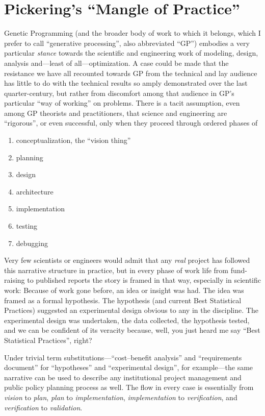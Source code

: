 \section{Pickering's ``Mangle of Practice''}\hypertarget{pickerings-mangle-of-practice}{}\label{pickerings-mangle-of-practice}

Genetic Programming (and the broader body of work to which it belongs, which I prefer to call ``generative processing'', also abbreviated ``GP'') embodies a very particular \emph{stance} towards the scientific and engineering work of modeling, design, analysis and---least of all---optimization. A case could be made that the resistance we have all recounted towards GP from the technical and lay audience has little to do with the technical results so amply demonstrated over the last quarter-century, but rather from discomfort among that audience in GP's particular ``way of working'' on problems. There is a tacit assumption, even among GP theorists and practitioners, that science and engineering are ``rigorous'', or even successful, only when they proceed through ordered phases of

\begin{enumerate}
\item conceptualization, the ``vision thing''
\item planning
\item design
\item architecture
\item implementation
\item testing
\item debugging
\end{enumerate}

Very few scientists or engineers would admit that any \emph{real} project has followed this narrative structure in practice, but in every phase of work life from fund-raising to published reports the story is framed in that way, especially in scientific work: Because of work gone before, an idea or insight was had. The idea was framed as a formal hypothesis. The hypothesis (and current Best Statistical Practices) suggested an experimental design obvious to any in the discipline. The experimental design was undertaken, the data collected, the hypothesis tested, and we can be confident of its veracity because, well, you just heard me say ``Best Statistical Practices'', right?

Under trivial term substitutions---``cost--benefit analysis'' and ``requirements document'' for ``hypotheses'' and ``experimental design'', for example---the same narrative can be used to describe any institutional project management and public policy planning process as well. The flow in every case is essentially from \emph{vision} to \emph{plan}, \emph{plan} to \emph{implementation}, \emph{implementation} to \emph{verification}, and \emph{verification} to \emph{validation}.

